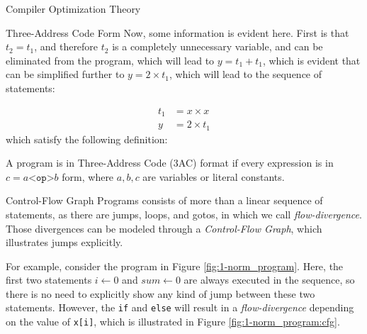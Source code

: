 \begin{section}{Compiler Optimization Theory}
\begin{subsection}{Three-Address Code Form}
Now, some information is evident here. First is that $t_2 = t_1$,
and therefore $t_2$ is a completely unnecessary variable, and can be
eliminated from the program, which will lead to $y = t_1 + t_1$, which is
evident that can be simplified further to $y = 2 \times t_1$, which will lead
to the sequence of statements:

\begin{align}
t_1 &= x \times x \nonumber \\
y &= 2 \times t_1 \nonumber
\end{align}
which satisfy the following definition:
\begin{definition}
	A program is in Three-Address Code (3AC) format if every expression is
	in $c = a \texttt{<op>} b$ form, where $a, b, c$ are variables or
	literal constants.
\end{definition}

\end{subsection}

\begin{subsection}{Control-Flow Graph}
	Programs consists of more than a linear sequence of statements, as there
	are jumps, loops, and gotos, in which we call
	\textit{flow-divergence}. Those divergences can be modeled through a
	\textit{Control-Flow Graph}, which illustrates jumps explicitly.

	For example,
	consider the program in Figure \ref{fig:1-norm_program}.  Here, the first
	two statements $i \leftarrow 0$ and $\textit{sum} \leftarrow 0$ are always
	executed in the sequence, so there is no need to explicitly show any kind of jump
	between these two statements. However, the \texttt{if} and \texttt{else}
	will result in a \textit{flow-divergence} depending on the value of
	\texttt{x[i]}, which is illustrated in Figure \ref{fig:1-norm_program:cfg}. 


\end{subsection}
\end{section}
